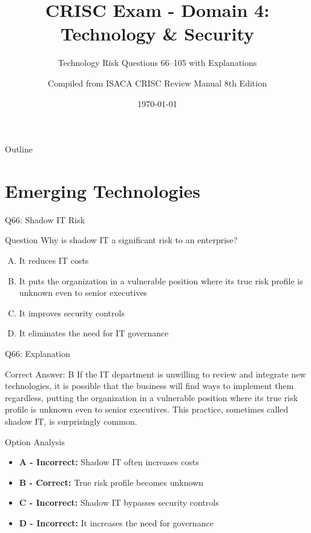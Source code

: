 \documentclass{beamer}
\title{CRISC Exam - Domain 4: Technology \& Security}
\subtitle{Technology Risk Questions 66--105 with Explanations}
\author{Compiled from ISACA CRISC Review Manual 8th Edition}
\date{\today}
\begin{document}
	
	\begin{frame}
		\titlepage
	\end{frame}
	
	\begin{frame}{Outline}
		\tableofcontents
	\end{frame}
	
	
	\section{Emerging Technologies}
	
	\begin{frame}{Q66: Shadow IT Risk}
		\begin{block}{Question}
			Why is shadow IT a significant risk to an enterprise?
		\end{block}
		\begin{enumerate}[(A)]
			\item It reduces IT costs
			\item It puts the organization in a vulnerable position where its true risk profile is unknown even to senior executives
			\item It improves security controls
			\item It eliminates the need for IT governance
		\end{enumerate}
	\end{frame}
	
	\begin{frame}{Q66: Explanation}
		\begin{block}{Correct Answer: B}
			If the IT department is unwilling to review and integrate new technologies, it is possible that the business will find ways to implement them regardless, putting the organization in a vulnerable position where its true risk profile is unknown even to senior executives. This practice, sometimes called shadow IT, is surprisingly common.
		\end{block}
		\begin{block}{Option Analysis}
			\begin{itemize}
				\item \textbf{A - Incorrect:} Shadow IT often increases costs
				\item \textbf{B - Correct:} True risk profile becomes unknown
				\item \textbf{C - Incorrect:} Shadow IT bypasses security controls
				\item \textbf{D - Incorrect:} It increases the need for governance
			\end{itemize}
		\end{block}
	\end{frame}
	
\end{document}
